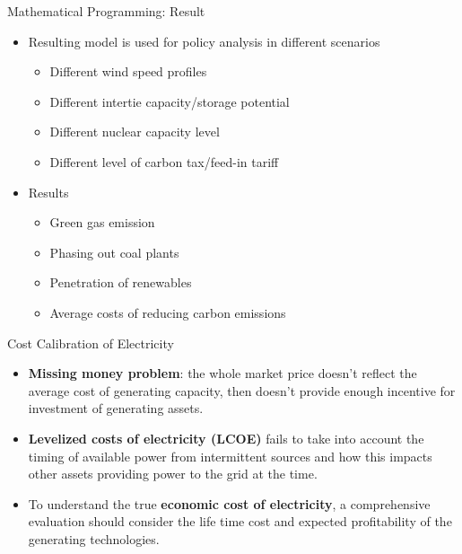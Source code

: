 \documentclass[newPxFont,numfooter,progressbar,sectionpages]{beamer}
\begin{document}

\begin{frame}[c]{Mathematical Programming: Result}

\begin{itemize}
	\item Resulting model is used for policy analysis in different scenarios
	\begin{itemize}
		\item Different wind speed profiles
		\item Different intertie capacity/storage potential
		\item Different nuclear capacity level 	 
		\item Different level of carbon tax/feed-in tariff
	\end{itemize}
	\item Results 
	\begin{itemize}
		\item Green gas emission
		\item Phasing out coal plants
		\item Penetration of renewables 	 
		\item Average costs of reducing carbon emissions 
	\end{itemize}
\end{itemize}

\end{frame}





\begin{frame}[c]{Cost Calibration of Electricity}

\begin{itemize}
	\item \textbf{Missing money problem}: the whole market price doesn't reflect the average cost of generating capacity, then doesn't provide enough incentive for investment of generating assets.  
	   
	\item \textbf{Levelized costs of electricity (LCOE)} fails to take into account the timing of available power from intermittent sources and how this impacts other assets providing power to the grid at the time.  
	
	\item To understand the true \textbf{economic cost of electricity}, a comprehensive evaluation should consider the life time cost and expected profitability of the generating technologies.
	
\end{itemize}


\end{frame}
\end{document}
